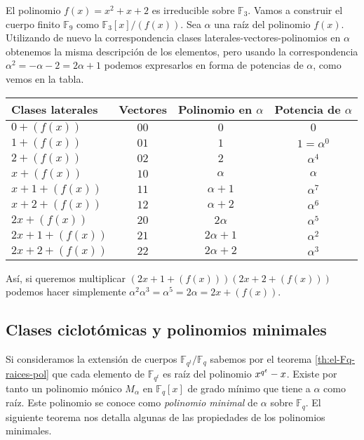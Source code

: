 \begin{example}
  El polinomio \(f(x) = x^2 + x + 2\) es irreducible sobre \(\mathbb F_3\).
  Vamos a construir el cuerpo finito \(\mathbb F_9\) como \(\mathbb F_3[x]/(f(x))\).
  Sea \(\alpha\) una raíz del polinomio \(f(x)\).
  Utilizando de nuevo la correspondencia clases laterales-vectores-polinomios en \(\alpha\) obtenemos la misma descripción de los elementos, pero usando la correspondencia \(\alpha^2 = -\alpha - 2 = 2\alpha + 1\) podemos expresarlos en forma de potencias de \(\alpha\), como vemos en la tabla.
  \begin{table}[h]
    \centering
    \sffamily
    \begin{tabular}{lccc}
      \toprule
      Clases laterales & Vectores & Polinomio en \(\alpha\) & Potencia de \(\alpha\)\\
      \midrule
      \(0 + (f(x))\) & \(00\) & \(0\) & \(0\)\\
      \(1 + (f(x))\) & \(01\) & \(1\) & \(1 = \alpha^0\)\\
      \(2 + (f(x))\) & \(02\) & \(2\) & \(\alpha^4\)\\
      \(x + (f(x))\) & \(10\) & \(\alpha\) & \(\alpha\)\\
      \(x + 1 + (f(x))\) & \(11\) & \(\alpha + 1\) & \(\alpha^7\)\\
      \(x + 2 + (f(x))\) & \(12\) & \(\alpha + 2\) & \(\alpha^6\)\\
      \(2x + (f(x))\) & \(20\) & \(2\alpha\) & \(\alpha^5\)\\
      \(2x + 1 + (f(x))\) & \(21\) & \(2\alpha + 1\) & \(\alpha^2\)\\
      \(2x + 2 + (f(x))\) & \(22\) & \(2\alpha + 2\) & \(\alpha^3\)\\
      \bottomrule
    \end{tabular}
  \end{table}

  Así, si queremos multiplicar \((2x + 1 + (f(x)))(2x + 2 + (f(x)))\) podemos hacer simplemente \(\alpha^2 \alpha^3 = \alpha^5 = 2\alpha = 2x + (f(x))\).
\end{example}


\subsection{Clases ciclotómicas y polinomios minimales}
\label{subsec:clases-ciclotomicas}

Si consideramos la extensión de cuerpos \(\mathbb F_{q^t}/\mathbb F_q\) sabemos por el teorema \ref{th:el-Fq-raices-pol} que cada elemento de \(\mathbb F_{q^t}\) es raíz del polinomio \(\cramped{x^{q^t}} - x\).
Existe por tanto un polinomio mónico \(M_{\alpha}\) en \(\mathbb F_q[x]\) de grado mínimo que tiene a \(\alpha\) como raíz.
Este polinomio se conoce como \emph{polinomio minimal} de \(\alpha\) sobre \(\mathbb F_q\).
El siguiente teorema nos detalla algunas de las propiedades de los polinomios minimales.

